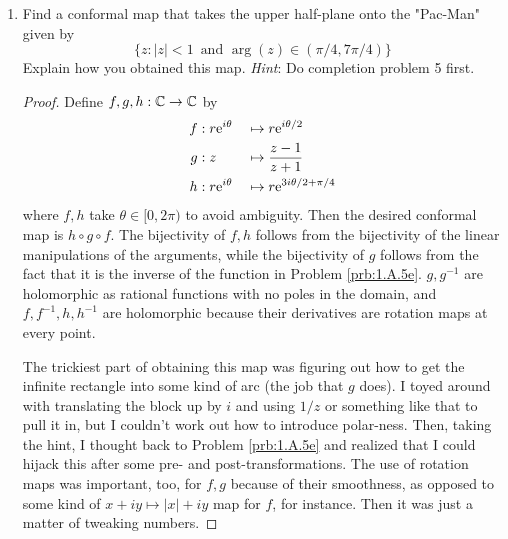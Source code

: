 \documentclass[../psets.tex]{subfiles}
\begin{document}
\begin{enumerate}[label={\textbf{\arabic*.}}]
\begin{proof}
        Suppose $f$ sends $(x,y)$ to $(g(x,y),h(x,y))$. If $f$ takes only real values, then $h(x,y)=0$ for all $(x,y)\in U$. Thus,
        \begin{equation*}
            h_x = h_y = 0
        \end{equation*}
        on $U$. Additionally, since $f$ is holomorphic on $U$, it satisfies the Cauchy-Riemann equations. This combined with the above equation implies that
        \begin{align*}
            g_x &= h_y = 0&
            g_y &= -h_x = 0
        \end{align*}
        Consequently, $f'=0$ on $U$, so $f$ must be constant on $U$.
    \end{proof}
    \item Find a conformal map that takes the upper half-plane onto the "Pac-Man" given by
    \begin{equation*}
        \{z:|z|<1\,\text{ and }\arg(z)\in(\pi/4,7\pi/4)\}
    \end{equation*}
    Explain how you obtained this map. \emph{Hint}: Do completion problem 5 first.
    \begin{proof}



        Define $f,g,h:\C\to\C$ by
        \begin{alignat*}{2}
            f&:r\e[i\theta] &&\mapsto r\e[i\theta/2]\\
            g&:z            &&\mapsto \frac{z-1}{z+1}\\
            h&:r\e[i\theta] &&\mapsto r\e[3i\theta/2+\pi/4]
        \end{alignat*}
        where $f,h$ take $\theta\in[0,2\pi)$ to avoid ambiguity. Then the desired conformal map is $h\circ g\circ f$. The bijectivity of $f,h$ follows from the bijectivity of the linear manipulations of the arguments, while the bijectivity of $g$ follows from the fact that it is the inverse of the function in Problem \ref{prb:1.A.5e}. $g,g^{-1}$ are holomorphic as rational functions with no poles in the domain, and $f,f^{-1},h,h^{-1}$ are holomorphic because their derivatives are rotation maps at every point.\par
        The trickiest part of obtaining this map was figuring out how to get the infinite rectangle into some kind of arc (the job that $g$ does). I toyed around with translating the block up by $i$ and using $1/z$ or something like that to pull it in, but I couldn't work out how to introduce polar-ness. Then, taking the hint, I thought back to Problem \ref{prb:1.A.5e} and realized that I could hijack this after some pre- and post-transformations. The use of rotation maps was important, too, for $f,g$ because of their smoothness, as opposed to some kind of $x+iy\mapsto|x|+iy$ map for $f$, for instance. Then it was just a matter of tweaking numbers.
    \end{proof}
\end{enumerate}
\end{document}
